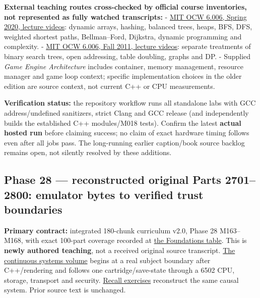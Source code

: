\textbf{External teaching routes cross-checked by official course inventories, not represented as fully watched transcripts:} - \href{https://ocw.mit.edu/courses/6-006-introduction-to-algorithms-spring-2020/video_galleries/lecture-videos/}{MIT OCW 6.006, Spring 2020, lecture videos}: dynamic arrays, hashing, balanced trees, heaps, BFS, DFS, weighted shortest paths, Bellman--Ford, Dijkstra, dynamic programming and complexity. - \href{https://ocw.mit.edu/courses/6-006-introduction-to-algorithms-fall-2011/video_galleries/lecture-videos/}{MIT OCW 6.006, Fall 2011, lecture videos}: separate treatments of binary search trees, open addressing, table doubling, graphs and DP. - Supplied \emph{Game Engine Architecture} includes container, memory management, resource manager and game loop context; specific implementation choices in the older edition are source context, not current C++ or CPU measurements.

\textbf{Verification status:} the repository workflow runs all standalone labs with GCC address/undefined sanitizers, strict Clang and GCC release (and independently builds the established C++ modules/M018 tests). Confirm the latest \textbf{actual hosted run} before claiming success; no claim of exact hardware timing follows even after all jobs pass. The long-running earlier caption/book source backlog remains open, not silently resolved by these additions.

\subsection{Phase 28 --- reconstructed original Parts 2701--2800: emulator bytes to verified trust boundaries}\label{appendix-a103e7846d21-phase-28-reconstructed-original-parts-27012800-emulator-bytes-to-verified-trust-boundaries}

\textbf{Primary contract:} integrated 180-chunk curriculum v2.0, Phase 28 M163--M168, with exact 100-part coverage recorded at \hyperref[appendix-fd090d982a15-phase-28-m163m168-parts-27012800-deterministic-and-trusted-low-level-systems]{the Foundations table}. This is \textbf{newly authored teaching}, not a received original source transcript. \href{Continuous\%20Notes/Computing\%20Foundations\%20-\%20From\%20Bits\%20to\%20C++\%20and\%20Systems\%20APIs}{The continuous systems volume} begins at a real subject boundary after C++/rendering and follows one cartridge/save-state through a 6502 CPU, storage, transport and security. \hyperref[appendix-11f73b337e37]{Recall exercises} reconstruct the same causal system. Prior source text is unchanged.

